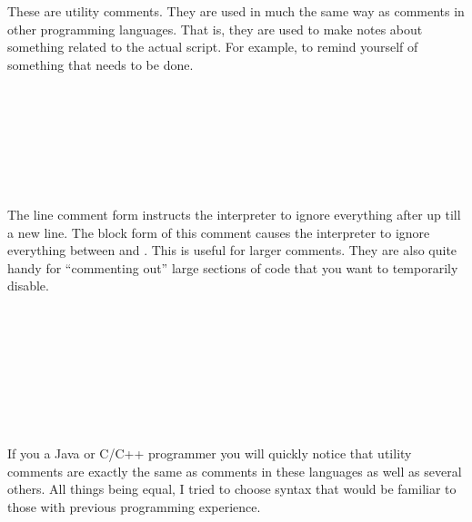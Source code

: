 These are utility comments.  They are used in much the same way as comments in other programming languages.  That is, they are used to make notes about something related to the actual script.  For example, to remind yourself of something that needs to be done.

\begin{SSCodeBox}
\scitea{\{} \\
\scitea{;} \\
\scitea{\hspace*{4em}} \\
\scitea{\hspace*{4em}}
 \\
\scitea{=}
\scitea{;} \\
\scitea{\}} \\
\end{SSCodeBox}


The line comment form instructs the interpreter to ignore everything after \SSCode{//} up till a new line.  The block form of this comment causes the interpreter to ignore everything between \SSCode{/*} and \SSCode{*/}.  This is useful for larger comments.  They are also quite handy for ``commenting out'' large sections of code that you want to temporarily disable.

\begin{SSCodeBox}
\scitea{} \\
\scitea{} \\
\scitek{/*} \\
 \\
 \\
 \\
\scitek{\}} \\
\scitek{*/}
\end{SSCodeBox}

If you a Java or C/C++ programmer you will quickly notice that utility comments are exactly the same as comments in these languages as well as several others.  All things being equal, I tried to choose syntax that would be familiar to those with previous programming experience.

